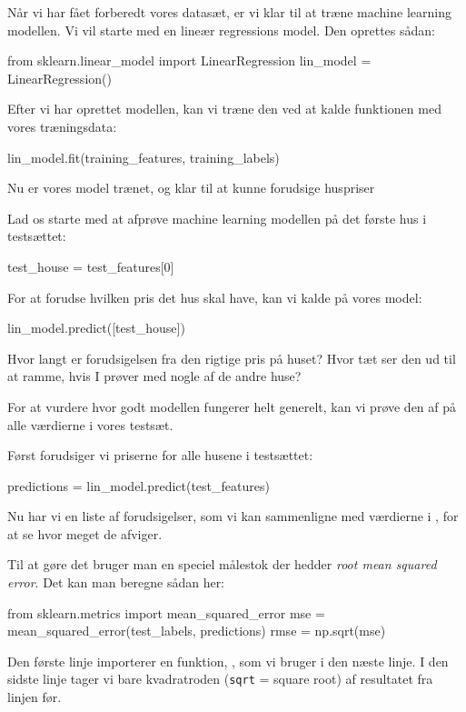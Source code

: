 \documentclass{ucph-handout}
\begin{document}
\begin{exercisebox}[adjusted title=Lineær regression som Machine Learning model]
Når vi har fået forberedt vores datasæt, er vi klar til at træne machine learning modellen. Vi vil starte med en lineær regressions model. Den oprettes sådan:
\begin{python}
from sklearn.linear_model import LinearRegression
lin_model = LinearRegression()
\end{python}

Efter vi har oprettet modellen, kan vi træne den ved at kalde  funktionen med vores træningsdata:
\begin{python}
lin_model.fit(training_features, training_labels)
\end{python}

Nu er vores model  trænet, og klar til at kunne forudsige huspriser


Lad os starte med at afprøve machine learning modellen på det første hus i testsættet:
\begin{python}
test_house = test_features[0]
\end{python}

For at forudse hvilken pris det hus skal have, kan vi kalde  på vores model:
\begin{python}
lin_model.predict([test_house])
\end{python}


Hvor langt er forudsigelsen fra den rigtige pris på huset? Hvor tæt ser den ud til at ramme, hvis I prøver med nogle af de andre huse?

For at vurdere hvor godt modellen fungerer helt generelt, kan vi prøve den af på alle værdierne i vores testsæt. \newline

Først forudsiger vi priserne for alle husene i testsættet:

\begin{python}
predictions = lin_model.predict(test_features)
\end{python}

Nu har vi en liste af forudsigelser, som vi kan sammenligne med værdierne i , for at se hvor meget de afviger.\newline

Til at gøre det bruger man en speciel målestok der hedder \textit{root mean squared error}. Det kan man beregne sådan her:

\begin{python}
from sklearn.metrics import mean_squared_error
mse = mean_squared_error(test_labels, predictions)
rmse = np.sqrt(mse)
\end{python}

Den første linje importerer en funktion, , som vi bruger i den næste linje. I den sidste linje tager vi bare kvadratroden (\texttt{sqrt} = square root) af resultatet fra linjen før.

\end{exercisebox}
\end{document}
